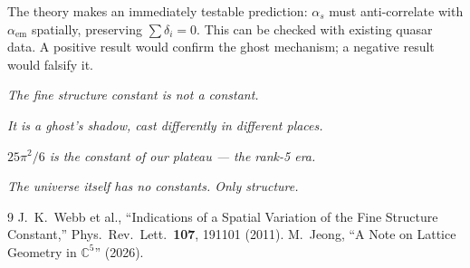 \documentclass[12pt]{article}
\theoremstyle{remark}
\begin{document}
The theory makes an immediately testable prediction: $\alpha_s$ must anti-correlate with $\alpha_\text{em}$ spatially, preserving $\sum\delta_i = 0$. This can be checked with existing quasar data. A positive result would confirm the ghost mechanism; a negative result would falsify it.

\begin{center}
\emph{The fine structure constant is not a constant.}

\emph{It is a ghost's shadow, cast differently in different places.}

\emph{$25\pi^2/6$ is the constant of our plateau --- the rank-5 era.}

\emph{The universe itself has no constants. Only structure.}
\end{center}

\begin{thebibliography}{9}
 J.~K.~Webb et al., ``Indications of a Spatial Variation of the Fine Structure Constant,'' Phys.~Rev.~Lett.\ \textbf{107}, 191101 (2011).
 M.~Jeong, ``A Note on Lattice Geometry in $\mathbb{C}^5$'' (2026).
\end{thebibliography}
\end{document}
